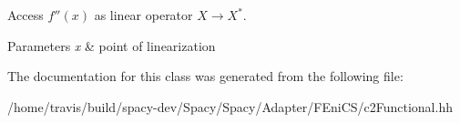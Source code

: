 \-Access $f''(x)$ as linear operator $X\rightarrow X^*$. 


\begin{DoxyParams}{\-Parameters}
{\em x} & point of linearization \\
\hline
\end{DoxyParams}


\-The documentation for this class was generated from the following file\-:\begin{DoxyCompactItemize}
\item 
/home/travis/build/spacy-\/dev/\-Spacy/\-Spacy/\-Adapter/\-F\-Eni\-C\-S/c2\-Functional.\-hh\end{DoxyCompactItemize}
